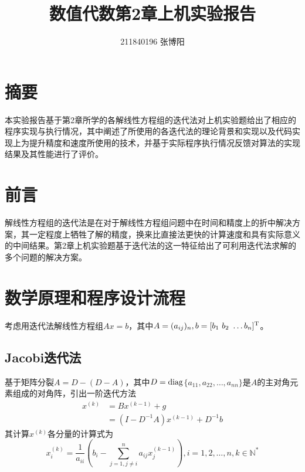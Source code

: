 \documentclass[UTF8,a4paper,10pt]{ctexart}
\title{\textbf{数值代数第2章上机实验报告}}
\author{ 211840196 张博阳 }
\date{}
\begin{document}
    \maketitle
 
    \section*{摘要}
        \par
        本实验报告基于第2章所学的各解线性方程组的迭代法对上机实验题给出了相应的程序实现与执行情况，其中阐述了所使用的各迭代法的理论背景和实现以及代码实现上为提升精度和速度所使用的技术，并基于实际程序执行情况反馈对算法的实现结果及其性能进行了评价。

    \section{前言}
        \par
        解线性方程组的迭代法是在对于解线性方程组问题中在时间和精度上的折中解决方案，其一定程度上牺牲了解的精度，换来比直接法更快的计算速度和具有实际意义的中间结果。第2章上机实验题基于迭代法的这一特征给出了可利用迭代法求解的多个问题的解决方案。
        
    \section{数学原理和程序设计流程}
        \par
        考虑用迭代法解线性方程组$Ax=b$，其中$A=(a_{ij})_n,b=[b_1\ b_2\ \dots b_n]^{\rm{T}}$。
        \subsection{Jacobi迭代法}
            \par
            基于矩阵分裂$A=D-(D-A)$，其中$D=\rm{diag}$$\{a_{11},a_{22},\dots,a_{nn}\}$是$A$的主对角元素组成的对角阵，引出一阶迭代方法
            \begin{align*}
                x^{(k)}&=Bx^{(k-1)}+g \\
                &=(I-D^{-1}A)x^{(k-1)}+D^{-1}b
            \end{align*}
            其计算$x^{(k)}$各分量的计算式为
            $$
            x^{(k)}_i=\dfrac{1}{a_{ii}}\left(b_i-\sum_{j=1,j\neq i}^{n}a_{ij}x^{(k-1)}_j\right),i=1,2,\dots,n,k\in\mathbb{N^*}
            $$
\end{document}
